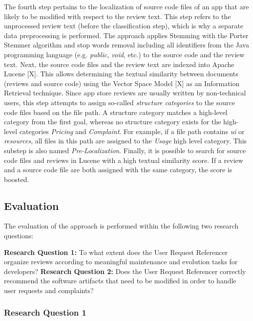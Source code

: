 The fourth step pertains to the localization of source code files of an app that are likely to be modified with respect to the review text. This step refers to the unprocessed review text (before the classification step), which is why a separate data preprocessing is performed. The approach applies Stemming with the Porter Stemmer algorithm and stop words removal including all identifiers from the Java programming language (e.g. \textit{public}, \textit{void}, etc.) to the source code and the review text. Next, the source code files and the review text are indexed into Apache Lucene [X]. This allows determining the textual similarity between documents (reviews and source code) using the Vector Space Model [X] as an Information Retrieval technique. \newline
Since app store reviews are usually written by non-technical users, this step attempts to assign so-called \textit{structure categories} to the source code files based on the file path. A structure category matches a high-level category from the first goal, whereas no structure category exists for the high-level categories \textit{Pricing} and \textit{Complaint}. For example, if a file path contains \textit{ui} or \textit{resources}, all files in this path are assigned to the \textit{Usage} high level category. This substep is also named \textit{Pre-Localization}.
Finally, it is possible to search for source code files and reviews in Lucene with a high textual similarity score. If a review and a source code file are both assigned with the same category, the score is boosted.


\subsection{Evaluation}

The evaluation of the approach is performed within the following two research questions: 


\textbf{Research Question 1:} To what extent does the User Request Referencer organize reviews according to meaningful maintenance and evolution tasks for developers? \newline
\textbf{Research Question 2:} Does the User Request Referencer correctly recommend the software artifacts that need to be modified in order to handle user requests and complaints?

\subsubsection{Research Question 1}

